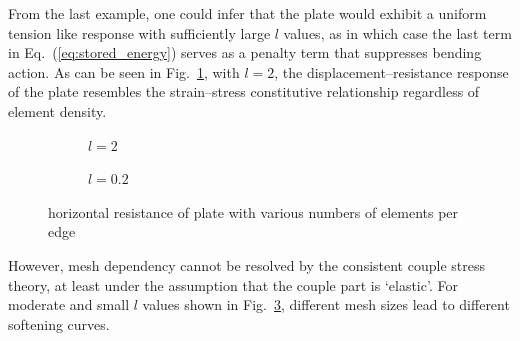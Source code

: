 \documentclass[3p,sort&compress,11pt,fleqn]{elsarticle}
\newcommand*{\figref}[1]{Fig.~\ref{#1}}
\newcommand*{\eqsref}[1]{Eq.~(\ref{#1})}
\begin{document}
From the last example, one could infer that the plate would exhibit a uniform tension like response with sufficiently large $l$ values, as in which case the last term in \eqsref{eq:stored_energy} serves as a penalty term that suppresses bending action. As can be seen in \figref{fig:plate_resistance_large_l}, with $l=\num{2}$, the displacement--resistance response of the plate resembles the strain--stress constitutive relationship regardless of element density.
\begin{figure}[ht]
\centering\footnotesize
\begin{subfigure}[b]{.48\textwidth}\centering

\caption{$l=\num{2}$}\label{fig:plate_resistance_large_l}
\end{subfigure}\hfill
\begin{subfigure}[b]{.48\textwidth}\centering

\caption{$l=\num{0.2}$}\label{fig:plate_resistance_small_l}
\end{subfigure}
\caption{horizontal resistance of plate with various numbers of elements per edge}
\end{figure}
However, mesh dependency cannot be resolved by the consistent couple stress theory, at least under the assumption that the couple part is `elastic'. For moderate and small $l$ values shown in \figref{fig:plate_resistance_small_l}, different mesh sizes lead to different softening curves.
\end{document}
